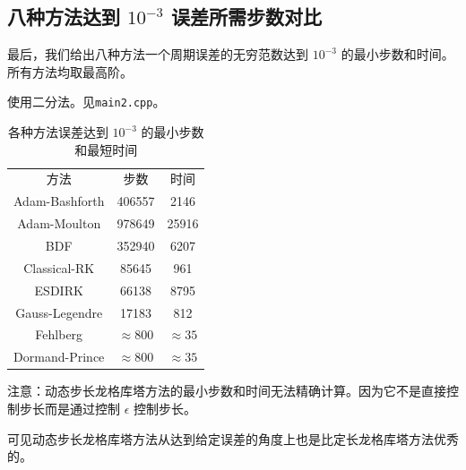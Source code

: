 \documentclass{ctexart}
\begin{document}
\subsection{八种方法达到 $10^{-3}$ 误差所需步数对比}

最后，我们给出八种方法一个周期误差的无穷范数达到 $10^{-3}$ 的最小步数和时间。所有方法均取最高阶。

使用二分法。见\verb|main2.cpp|。

\begin{table}\centering
	\begin{tabular}{|c|c|c|}
	\hline
	方法 & 步数 & 时间 \\ \cline{1-3}
	Adam-Bashforth & 406557 & 2146\\ \cline{1-3}
	Adam-Moulton & 978649 & 25916\\ \cline{1-3}
	BDF & 352940 & 6207\\ \cline{1-3}
	Classical-RK & 85645 & 961\\ \cline{1-3}
	ESDIRK & 66138 & 8795\\ \cline{1-3}
	Gauss-Legendre & 17183 & 812\\ \cline{1-3}
	Fehlberg & $\approx 800$ & $\approx 35$\\ \cline{1-3}
	Dormand-Prince & $\approx 800$ & $\approx 35$\\ \cline{1-3}
\end{tabular}
\caption{各种方法误差达到 $10^{-3}$ 的最小步数和最短时间}
\end{table}

注意：动态步长龙格库塔方法的最小步数和时间无法精确计算。因为它不是直接控制步长而是通过控制 $\epsilon$ 控制步长。

可见动态步长龙格库塔方法从达到给定误差的角度上也是比定长龙格库塔方法优秀的。
\end{document}
